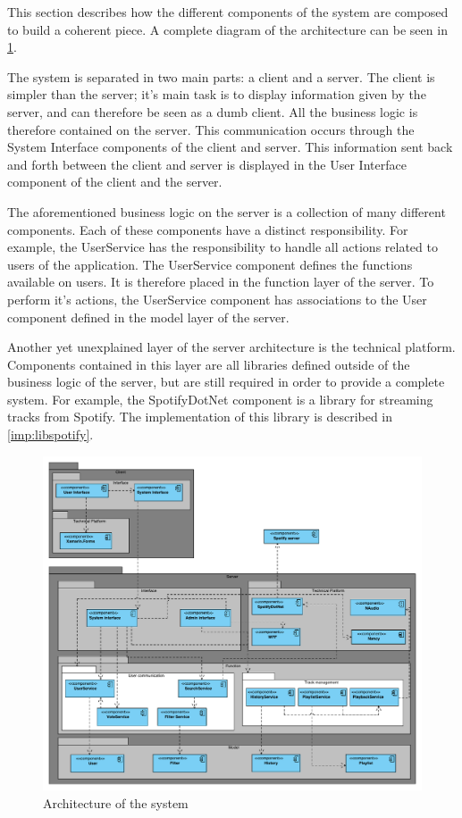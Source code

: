 \label{sec:architecture}

This section describes how the different components of the system are
composed to build a coherent piece. A complete diagram of the
architecture can be seen in \cref{fig:architecture}.

The system is separated in two main parts: a client and a server. The
client is simpler than the server; it's main task is to display
information given by the server, and can therefore be seen as a dumb
client. All the business logic is therefore contained on the
server. This communication occurs through the System Interface
components of the client and server. This information sent back and
forth between the client and server is displayed in the User Interface
component of the client and the server.

The aforementioned business logic on the server is a collection of
many different components. Each of these components have a distinct
responsibility. For example, the UserService has the responsibility to
handle all actions related to users of the application. The
UserService component defines the functions available on users. It is
therefore placed in the function layer of the server. To perform it's
actions, the UserService component has associations to the User
component defined in the model layer of the server.

Another yet unexplained layer of the server architecture is the
technical platform. Components contained in this layer are all
libraries defined outside of the business logic of the server, but are
still required in order to provide a complete system. For example, the
SpotifyDotNet component is a library for streaming tracks from
Spotify. The implementation of this library is described in
\cref{imp:libspotify}.

\begin{figure}
  \centering
  \includegraphics[width=1.2\linewidth]{Images/Arkitektur.pdf}
  \caption{Architecture of the system}\label{fig:architecture}
\end{figure}
